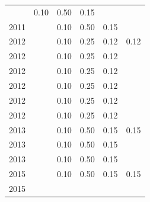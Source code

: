 \begin{table}[H]
\begin{tabular}{| l | c | c | c | c | c |}
          &
          0.10
          &
          0.50
          &
          0.15
          &
          \\
            2011
          &
          
          &
          0.10
          &
          0.50
          &
          0.15
          &
          \\
\hline
            2012
          &
          
          &
          0.10
          &
          0.25
          &
          0.12
          &
            {\color{red} 0.12}
          \\
            2012
          &
          
          &
          0.10
          &
          0.25
          &
          0.12
          &
          \\
            2012
          &
          
          &
          0.10
          &
          0.25
          &
          0.12
          &
          \\
            2012
          &
          
          &
          0.10
          &
          0.25
          &
          0.12
          &
          \\
            2012
          &
          
          &
          0.10
          &
          0.25
          &
          0.12
          &
          \\
            2012
          &
          
          &
          0.10
          &
          0.25
          &
          0.12
          &
          \\
\hline
            2013
          &
          
          &
          0.10
          &
          0.50
          &
          0.15
          &
            {\color{red} 0.15}
          \\
            2013
          &
          
          &
          0.10
          &
          0.50
          &
          0.15
          &
          \\
            2013
          &
          
          &
          0.10
          &
          0.50
          &
          0.15
          &
          \\
\hline
            2015
          &
          
          &
          0.10
          &
          0.50
          &
          0.15
          &
            {\color{red} 0.15}
          \\
            2015
          &
          

\end{tabular}
\end{table}
